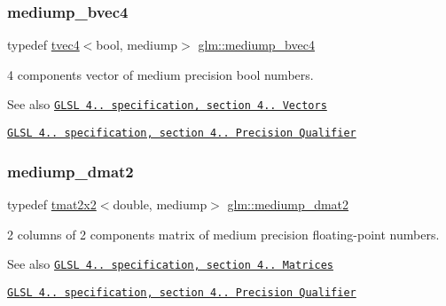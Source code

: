 \subsubsection{\texorpdfstring{mediump\+\_\+bvec4}{mediump\_bvec4}}
{\footnotesize\ttfamily typedef \hyperlink{structglm_1_1tvec4}{tvec4}$<$bool, mediump$>$ \hyperlink{group__core__precision_ga92b3f3ba6ecceaea364906ad7ee985a5}{glm\+::mediump\+\_\+bvec4}}

4 components vector of medium precision bool numbers.

\begin{DoxySeeAlso}{See also}
\href{http://www.opengl.org/registry/doc/GLSLangSpec.4.20.8.pdf}{\tt G\+L\+SL 4.. specification, section 4.. Vectors} 

\href{http://www.opengl.org/registry/doc/GLSLangSpec.4.20.8.pdf}{\tt G\+L\+SL 4.. specification, section 4.. Precision Qualifier} 
\end{DoxySeeAlso}
\mbox{\label{group__core__precision_ga15d28c9d2c24b698597e9ad9e083520d}} 
\subsubsection{\texorpdfstring{mediump\+\_\+dmat2}{mediump\_dmat2}}
{\footnotesize\ttfamily typedef \hyperlink{structglm_1_1tmat2x2}{tmat2x2}$<$double, mediump$>$ \hyperlink{group__core__precision_ga15d28c9d2c24b698597e9ad9e083520d}{glm\+::mediump\+\_\+dmat2}}

2 columns of 2 components matrix of medium precision floating-\/point numbers.

\begin{DoxySeeAlso}{See also}
\href{http://www.opengl.org/registry/doc/GLSLangSpec.4.20.8.pdf}{\tt G\+L\+SL 4.. specification, section 4.. Matrices} 

\href{http://www.opengl.org/registry/doc/GLSLangSpec.4.20.8.pdf}{\tt G\+L\+SL 4.. specification, section 4.. Precision Qualifier} 
\end{DoxySeeAlso}
\mbox{\label{group__core__precision_ga949bee59342f1c3258522bacd07ffe95}} 
